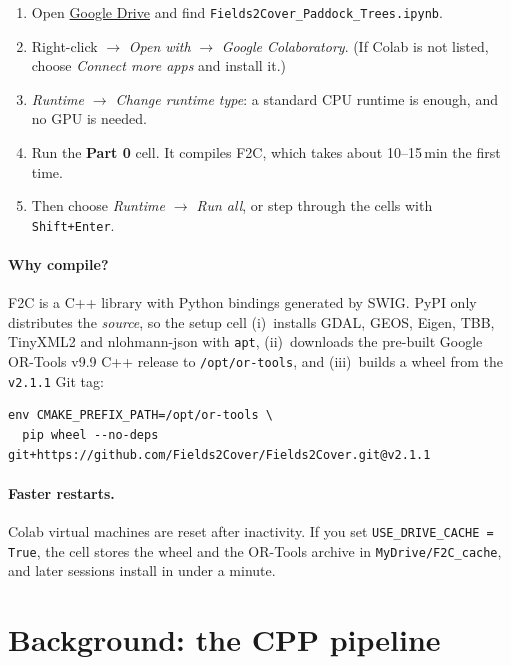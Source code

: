 \documentclass[11pt,a4paper]{article}
\newcommand{\code}[1]{\texttt{\small #1}}
\newcommand{\cell}[1]{\textsf{\bfseries\color{f2cblue}#1}}
\begin{document}
\begin{runbox}[Steps]
\begin{enumerate}[nosep,leftmargin=*]
  \item Open \href{https://drive.google.com}{Google Drive} and find \code{Fields2Cover\_Paddock\_Trees.ipynb}.
  \item Right-click $\rightarrow$ \emph{Open with} $\rightarrow$ \emph{Google Colaboratory}.
        (If Colab is not listed, choose \emph{Connect more apps} and install it.)
  \item \emph{Runtime $\rightarrow$ Change runtime type}: a standard CPU runtime is enough, and no GPU is needed.
  \item Run the \cell{Part 0} cell. It compiles F2C, which takes about 10--15\,min the first time.
  \item Then choose \emph{Runtime $\rightarrow$ Run all}, or step through the cells with \texttt{Shift+Enter}.
\end{enumerate}
\end{runbox}

\paragraph{Why compile?} F2C is a C++ library with Python bindings generated by SWIG. PyPI only distributes the
\emph{source}, so the setup cell (i)~installs GDAL, GEOS, Eigen, TBB, TinyXML2 and nlohmann-json with \code{apt},
(ii)~downloads the pre-built Google OR-Tools v9.9 C++ release to \code{/opt/or-tools}, and (iii)~builds a wheel from the
\code{v2.1.1} Git tag:
\begin{lstlisting}[language={}]
env CMAKE_PREFIX_PATH=/opt/or-tools \
  pip wheel --no-deps git+https://github.com/Fields2Cover/Fields2Cover.git@v2.1.1
\end{lstlisting}

\paragraph{Faster restarts.} Colab virtual machines are reset after inactivity. If you set
\code{USE\_DRIVE\_CACHE = True}, the cell stores the wheel and the OR-Tools archive in \code{MyDrive/F2C\_cache}, and later
sessions install in under a minute.

\section{Background: the CPP pipeline}\label{sec:theory}
\end{document}
